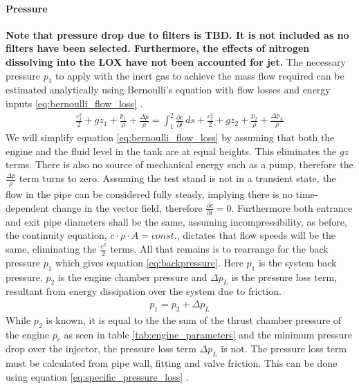             \paragraph{Pressure}
                \textbf{Note that pressure drop due to filters is TBD. It is not included as no filters have been selected. Furthermore, the effects of nitrogen dissolving into the LOX have not been accounted for jet.} The necessary pressure $p_1$ to apply with the inert gas to achieve the mass flow required can be estimated analytically using Bernoulli's equation with flow losses and energy inputs \ref{eq:bernoulli_flow_loss} \cite[118]{Paschereit:2022}.
                \begin{align}
                    \frac{c_1^2}{2} + gz_1 + \frac{p_1}{\rho} +  \frac{\Delta p}{\rho} = \int_{1}^{2} \frac{\partial c}{\partial t} \, ds + \frac{c_2^2}{2} + gz_2 + \frac{p_2}{\rho} + \frac{\Delta p_L}{\rho} \label{eq:bernoulli_flow_loss}
                \end{align}
                We will simplify equation \ref{eq:bernoulli_flow_loss} by assuming that both the engine and the fluid level in the tank are at equal heights. This eliminates the $gz$ terms. There is also no source of mechanical energy such as a pump, therefore the $\frac{\Delta p}{\rho}$ term turns to zero. Assuming the test stand is not in a transient state, the flow in the pipe can be considered fully steady, implying there is no time-dependent change in the vector field, therefore $\frac{\partial c}{\partial t} = 0$. Furthermore both entrance and exit pipe diameters shall be the same, assuming incompressibility, as before, the continuity equation, $c\cdot\rho\cdot A = const.$, dictates that flow speeds will be the same, eliminating the $\frac{c^2}{2}$ terms. All that remains is to rearrange for the back pressure $p_1$ which gives equation \ref{eq:backpressure}. Here $p_1$ is the system back pressure, $p_2$ is the engine chamber pressure and $\Delta p_L$ is the pressure loss term, resultant from energy dissipation over the system due to friction.
                \begin{align}
                    p_1 = p_2 + \Delta p_L\label{eq:backpressure}
                \end{align}
                While $p_2$ is known, it is equal to the the sum of the thrust chamber pressure of the engine $p_c$ as seen in table \ref{tab:engine_parameters} and the minimum pressure drop over the injector, the pressure loss term $\Delta p_L$ is not. The pressure loss term must be calculated from pipe wall, fitting and valve friction. This can be done using equation \ref{eq:specific_pressure_loss} \cite[134]{Paschereit:2022}.
